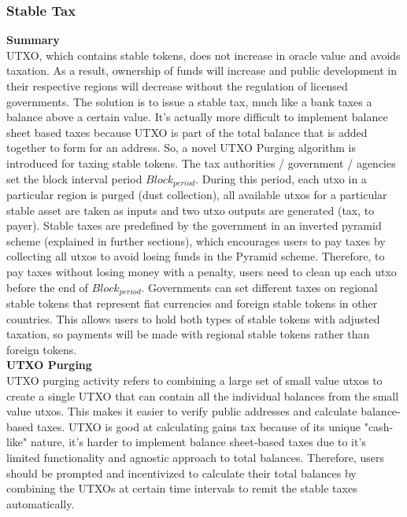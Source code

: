 \documentclass[letterpaper,11pt]{article}
\begin{document}
\subsubsection{Stable Tax}

\textbf{Summary}\\

UTXO, which contains stable tokens, does not increase in oracle value and avoids taxation. As a result, ownership of funds will increase and public development in their respective regions will decrease without the regulation of licensed governments. The solution is to issue a stable tax, much like a bank taxes a balance above a certain value. It's actually more difficult to implement balance sheet based taxes because UTXO is part of the total balance that is added together to form for an address. So, a novel UTXO Purging algorithm is introduced for taxing stable tokens. The tax authorities / government / agencies set the block interval period $ Block_ {period} $. During this period, each utxo in a particular region is purged (dust collection), all  available utxos for a particular stable asset are taken as inputs and two utxo outputs are generated (tax, to payer). Stable taxes are predefined by the government in an inverted pyramid scheme (explained in further sections), which encourages users to pay taxes by collecting all utxos  to avoid losing funds in the Pyramid scheme. Therefore, to pay taxes without losing money with a penalty, users need to clean up each utxo before the end of $ Block_ {period} $. Governments can set different taxes on regional stable tokens that represent fiat currencies and foreign stable tokens in other countries. This allows users to hold both types of stable tokens with  adjusted taxation, so payments will be made with regional stable tokens rather than foreign tokens. \\

\textbf{UTXO Purging}\\

UTXO purging activity refers to combining a large set of small value utxos to create a single UTXO that can contain all the individual balances from the small value utxos. This makes it easier to verify public addresses and calculate balance-based taxes. UTXO is good at calculating gains tax because of its unique "cash-like" nature, it's harder to implement balance sheet-based taxes due to it's limited functionality and agnostic approach to total balances. Therefore, users should be prompted and incentivized to calculate their total balances by combining the UTXOs at certain time intervals to remit the stable taxes automatically.\\
\end{document}
